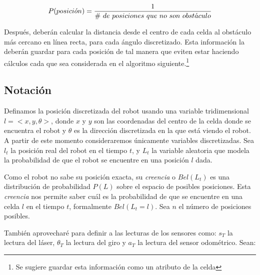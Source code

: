 \[ P(posici\acute{o}n) = {1 \over \# \ de\ posiciones\ que\ no\ son\ obst\acute{a}culo}\]\medskip

Después, deberán calcular la distancia desde el centro de cada celda al obstáculo más cercano en línea recta, para cada ángulo discretizado. Esta información la deberán guardar para cada posición de tal manera que eviten estar haciendo cálculos cada que sea considerada en el algoritmo siguiente.\footnote{Se sugiere guardar esta información como un atributo de la celda}

\subsection{Notaci\'on}

Definamos la posición discretizada del robot usando una variable tridimensional $l = <x,y,\theta>$, donde $x$ y $y$ son las coordenadas del centro de la celda donde se encuentra el robot y $\theta$ es la dirección discretizada en la que está viendo el robot. A partir de este momento consideraremos únicamente variables discretizadas. Sea $l_t$ la posición real del robot en el tiempo $t$, y $L_t$ la variable aleatoria que modela la probabilidad de que el robot se encuentre en una posición $l$ dada.

Como el robot no sabe su posición exacta, su \textit{creencia} o $Bel(L_t)$ es una distribución de probabilidad \(P(L)\) sobre el espacio de posibles posiciones. Esta \textit{creencia} nos permite saber cuál es la probabilidad de que se encuentre en una celda $l$ en el tiempo $t$, formalmente $Bel(L_t = l)$. Sea \(n\) el número de posiciones posibles.


También aprovecharé para definir a las lecturas de los sensores como: $s_T$ la lectura del láser, $\theta_T$ la lectura del giro y $a_T$ la lectura del sensor odométrico. Sean:

